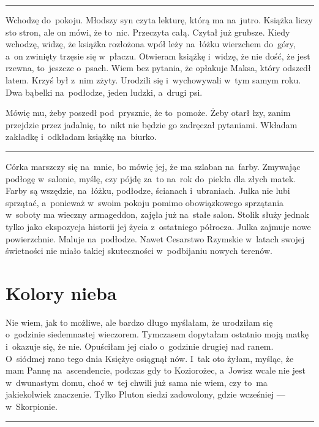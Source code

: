 \documentclass[9pt, a5paper]{memoir}
\begin{document}
\fancybreak{* \quad * \quad *}

Wchodzę do~pokoju. Młodszy syn czyta lekturę, którą ma na~jutro. Książka liczy sto stron, ale on mówi, że to~nic. Przeczyta całą. Czytał już grubsze. Kiedy wchodzę, widzę, że książka rozłożona wpół leży na~łóżku wierzchem do~góry, a~on zwinięty trzęsie się w~płaczu. Otwieram książkę i~widzę, że nie dość, że jest rzewna, to~jeszcze o~psach. Wiem bez pytania, że opłakuje Maksa, który odszedł latem. Krzyś był z~nim zżyty. Urodzili się i~wychowywali w~tym samym roku. Dwa bąbelki na~podłodze, jeden ludzki, a~drugi psi.

Mówię mu, żeby poszedł pod~prysznic, że to~pomoże. Żeby otarł łzy, zanim przejdzie przez jadalnię, to~nikt nie będzie go zadręczał pytaniami. Wkładam zakładkę i~odkładam książkę na~biurko.


\fancybreak{* \quad * \quad *}

Córka marszczy się na~mnie, bo mówię jej, że ma szlaban na~farby. Zmywając podłogę w~salonie, myślę, czy pójdę za~to na~rok do~piekła dla złych matek. Farby są wszędzie, na~łóżku, podłodze, ścianach i~ubraniach. Julka nie lubi sprzątać, a~ponieważ w~swoim pokoju pomimo obowiązkowego sprzątania w~soboty ma wieczny armageddon, zajęła już na~stałe salon. Stolik służy jednak tylko jako ekspozycja historii jej życia z~ostatniego półrocza. Julka zajmuje nowe powierzchnie. Maluje na~podłodze. Nawet Cesarstwo Rzymskie w~latach swojej świetności nie miało takiej skuteczności w~podbijaniu nowych terenów.

\newpage
\section{Kolory nieba}
Nie wiem, jak to możliwe, ale bardzo długo myślałam, że urodziłam się o~godzinie siedemnastej wieczorem. Tymczasem dopytałam ostatnio moją matkę i~okazuje się, że nie. Opuściłam jej ciało o~godzinie drugiej nad ranem. O~siódmej rano tego dnia Księżyc osiągnął nów. I~tak oto żyłam, myśląc, że mam Pannę na~ascendencie, podczas gdy to Koziorożec, a~Jowisz wcale nie jest w~dwunastym domu, choć w~tej chwili już sama nie wiem, czy to~ma jakiekolwiek znaczenie. Tylko Pluton siedzi zadowolony, gdzie wcześniej --- w~Skorpionie.

\fancybreak{* \quad * \quad *}
\end{document}
